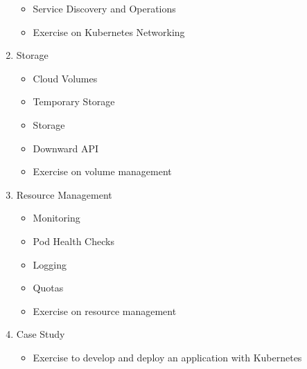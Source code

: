 \documentclass[a4paper,11pt]{article}
\begin{document}
\begin{enumerate}
\begin{itemize}
  \item Service Discovery and Operations
  \item Exercise on Kubernetes Networking
\end{itemize}
\item Storage
\begin{itemize}
  \item Cloud Volumes
  \item Temporary Storage
  \item Storage
  \item Downward API
  \item Exercise on volume management
\end{itemize}
\item Resource Management
\begin{itemize}
  \item Monitoring
  \item Pod Health Checks
  \item Logging
  \item Quotas
  \item Exercise on resource management
\end{itemize}
\item Case Study
\begin{itemize}
  \item Exercise to develop and deploy an application with Kubernetes
\end{itemize}
\end{enumerate}
\end{document}
